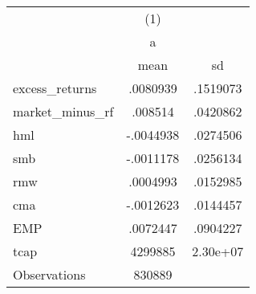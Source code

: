 {
\def\sym#1{\ifmmode^{#1}\else\(^{#1}\)\fi}
\begin{tabular}{l*{1}{cc}}
\hline\hline
                    &\multicolumn{1}{c}{(1)}&            \\
                    &           a&            \\
                    &        mean&          sd\\
\hline
excess\_returns      &    .0080939&    .1519073\\
market\_minus\_rf     &     .008514&    .0420862\\
hml                 &   -.0044938&    .0274506\\
smb                 &   -.0011178&    .0256134\\
rmw                 &    .0004993&    .0152985\\
cma                 &   -.0012623&    .0144457\\
EMP                 &    .0072447&    .0904227\\
tcap                &     4299885&    2.30e+07\\
\hline
Observations        &      830889&            \\
\hline\hline
\end{tabular}
}
